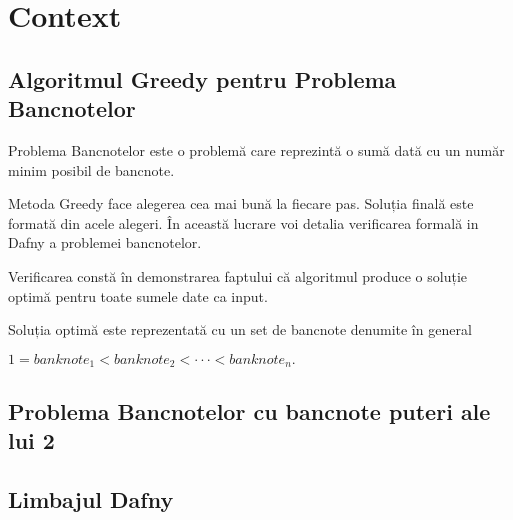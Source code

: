 


\chapter{Context} 

\section{Algoritmul Greedy pentru Problema Bancnotelor} 
Problema Bancnotelor este o problemă care reprezintă o sumă dată cu un număr minim posibil de bancnote.\par
Metoda Greedy face alegerea cea mai bună la fiecare pas. Soluția finală este formată din acele alegeri.
În această lucrare voi detalia verificarea formală in Dafny a problemei bancnotelor.\par
Verificarea constă în demonstrarea faptului că algoritmul produce o soluție optimă pentru toate 
sumele date ca input. \par
Soluția optimă este reprezentată cu un set de bancnote denumite în general

$ 1 = banknote_{1} < banknote_{2} <···< banknote_{n} . $


\section{Problema Bancnotelor cu bancnote puteri ale lui 2}

\section{Limbajul Dafny} 
